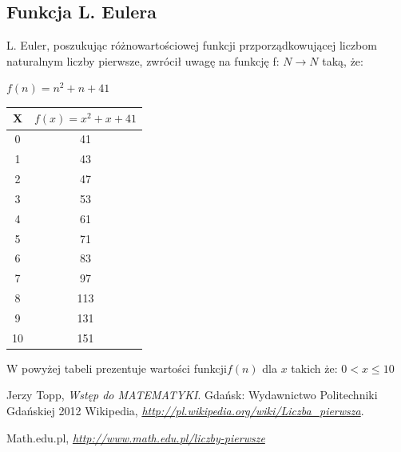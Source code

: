 \documentclass{article}
\begin{document}
\subsection{Funkcja L. Eulera}
L. Euler, poszukując różnowartościowej funkcji przporządkowującej liczbom naturalnym liczby pierwsze, zwrócił uwagę na funkcję f: \( N \to N \) taką, że: \\
\begin{center} \(f(n) = n^{2} + n + 41 \) \cite{topp}
\newline \newline \newline

\begin{tabular}{|c|c|}
  \hline 
  X & \(f(x) = x^{2} + x + 41 \)\\
  \hline
  0 & 41 \\
  \hline
  1 & 43 \\
  \hline
  2 & 47 \\
  \hline
  3 & 53 \\
  \hline
  4 & 61 \\
  \hline
  5 & 71 \\
  \hline
  6 & 83 \\
  \hline
  7 & 97 \\
  \hline
  8 & 113 \\
  \hline
  9 & 131 \\
  \hline
  10 & 151 \\
  \hline
\end{tabular}  \end{center}
W powyżej tabeli prezentuje wartości funkcji\( f(n)\) dla \(x\) takich że: \( 0 < x \leq 10\)

\newpage
\begin{thebibliography}{9}
  Jerzy Topp,
  \emph{Wstęp do MATEMATYKI}.
  Gdańsk:
  Wydawnictwo Politechniki Gdańskiej
  2012
  Wikipedia,
  \emph{\url{http://pl.wikipedia.org/wiki/Liczba_pierwsza}}.

 Math.edu.pl,
\emph{\url{http://www.math.edu.pl/liczby-pierwsze}}

\end{thebibliography}
\end{document}
